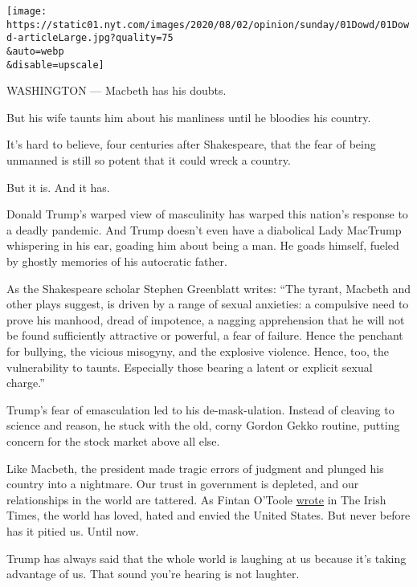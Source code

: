 \texttt{[image: https://static01.nyt.com/images/2020/08/02/opinion/sunday/01Dowd/01Dowd-articleLarge.jpg?quality=75\\\&auto=webp\\\&disable=upscale]}

WASHINGTON --- Macbeth has his doubts.

But his wife taunts him about his manliness until he bloodies his
country.

It's hard to believe, four centuries after Shakespeare, that the fear of
being unmanned is still so potent that it could wreck a country.

But it is. And it has.

Donald Trump's warped view of masculinity has warped this nation's
response to a deadly pandemic. And Trump doesn't even have a diabolical
Lady MacTrump whispering in his ear, goading him about being a man. He
goads himself, fueled by ghostly memories of his autocratic father.

As the Shakespeare scholar Stephen Greenblatt writes: ``The tyrant,
Macbeth and other plays suggest, is driven by a range of sexual
anxieties: a compulsive need to prove his manhood, dread of impotence, a
nagging apprehension that he will not be found sufficiently attractive
or powerful, a fear of failure. Hence the penchant for bullying, the
vicious misogyny, and the explosive violence. Hence, too, the
vulnerability to taunts. Especially those bearing a latent or explicit
sexual charge.''

Trump's fear of emasculation led to his de-mask-ulation. Instead of
cleaving to science and reason, he stuck with the old, corny Gordon
Gekko routine, putting concern for the stock market above all else.

Like Macbeth, the president made tragic errors of judgment and plunged
his country into a nightmare. Our trust in government is depleted, and
our relationships in the world are tattered. As Fintan O'Toole
\href{https://www.irishtimes.com/opinion/fintan-o-toole-donald-trump-has-destroyed-the-country-he-promised-to-make-great-again-1.4235928?mode=sample\&auth-failed=1\&pw-origin=https\%3A\%2F\%2Fwww.irishtimes.com\%2Fopinion\%2Ffintan-o-toole-donald-trump-has-destroyed-the-country-he-promised-to-make-great-again-1.4235928}{wrote}
in The Irish Times, the world has loved, hated and envied the United
States. But never before has it pitied us. Until now.

Trump has always said that the whole world is laughing at us because
it's taking advantage of us. That sound you're hearing is not laughter.

